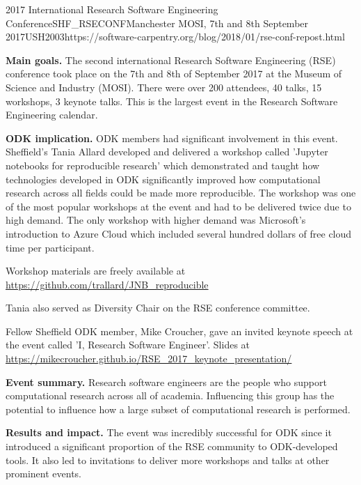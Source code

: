 \begin{event}{2017 International Research Software Engineering Conference}{SHF_RSECONF}{Manchester MOSI, 7th and 8th September 2017}{USH}{200}{3}{https://software-carpentry.org/blog/2018/01/rse-conf-repost.html}

\textbf{Main goals.} The second international Research Software Engineering (RSE) conference took place on the 7th and 8th of September 2017 at the Museum of Science and Industry (MOSI). There were over 200 attendees, 40 talks, 15 workshops, 3 keynote talks. This is the largest event in the Research Software Engineering calendar.

\textbf{ODK implication.} ODK members had significant involvement in this event. Sheffield's Tania Allard developed and delivered a workshop called 'Jupyter notebooks for reproducible research’ which demonstrated and taught how technologies developed in ODK significantly improved how computational research across all fields could be made more reproducible.  The workshop was one of the most popular workshops at the event and had to be delivered twice due to high demand. The only workshop with higher demand was Microsoft's introduction to Azure Cloud which included several hundred dollars of free cloud time per participant.

Workshop materials are freely available at \url{https://github.com/trallard/JNB_reproducible}

Tania also served as Diversity Chair on the RSE conference committee.

Fellow Sheffield ODK member, Mike Croucher, gave an invited keynote speech at the event called 'I, Research Software Engineer'. Slides at \url{https://mikecroucher.github.io/RSE_2017_keynote_presentation/}

\textbf{Event summary.} Research software engineers are the people who support computational research across all of academia. Influencing this group has the potential to influence how a large subset of computational research is performed. 

\textbf{Results and impact.} The event was incredibly successful for ODK since it introduced a significant proportion of the RSE community to ODK-developed tools.  It also led to invitations to deliver more workshops and talks at other prominent events.

\end{event}
